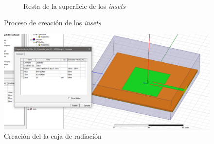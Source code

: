\begin{figure}[p]
\begin{subfigure}[b]{0.45\textwidth}
         \caption{Resta de la superficie de los \textit{insets}}
         \label{fig:insetb}
     \end{subfigure}
     \hfill
        \caption{Proceso de creación de los \textit{insets}}
        \label{fig:insets}
\end{figure}

\begin{figure}[p]
    \centering
        \includegraphics[width=\textwidth]{archivos/desarrollo/8}
        \caption{Creación del la caja de radiación}
        \label{fig:caja}
\end{figure}

